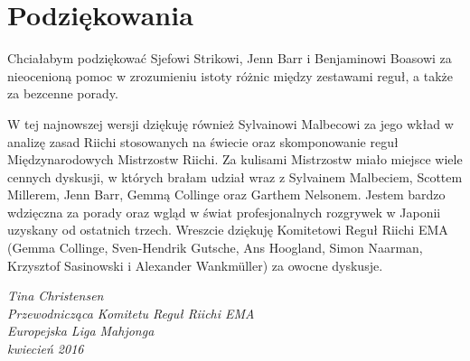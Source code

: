 \section*{Podziękowania}

Chciałabym podziękować Sjefowi Strikowi, Jenn Barr i Benjaminowi Boasowi za nieocenioną pomoc w zrozumieniu istoty różnic między zestawami reguł, a także za bezcenne porady.

W tej najnowszej wersji dziękuję również Sylvainowi Malbecowi za jego wkład w analizę zasad Riichi stosowanych na świecie oraz skomponowanie reguł Międzynarodowych Mistrzostw Riichi.
Za kulisami Mistrzostw miało miejsce wiele cennych dyskusji, w których brałam udział wraz z Sylvainem Malbeciem, Scottem Millerem, Jenn Barr, Gemmą Collinge oraz Garthem Nelsonem.
Jestem bardzo wdzięczna za porady oraz wgląd w świat profesjonalnych rozgrywek w Japonii uzyskany od ostatnich trzech.
Wreszcie dziękuję Komitetowi Reguł Riichi EMA (Gemma Collinge, Sven-Hendrik Gutsche, Ans Hoogland, Simon Naarman, Krzysztof Sasinowski i Alexander Wankmüller) za owocne dyskusje.
\begin{flushright}
    \emph{
        Tina Christensen\\
        Przewodnicząca Komitetu Reguł Riichi EMA\\
        Europejska Liga Mahjonga\\
        kwiecień 2016
    }
\end{flushright}